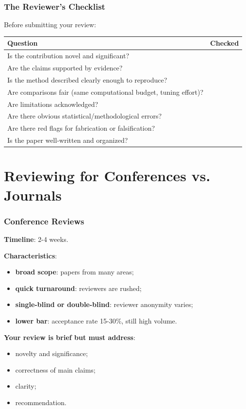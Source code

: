 \documentclass[]{beamer}
\begin{document}
\begin{frame}[fragile]
\frametitle{The Reviewer's Checklist}
Before submitting your review:

{\footnotesize
\begin{tabular}{p{6.5cm}p{3.5cm}}
\toprule
\textbf{Question} & \textbf{Checked} \\
\midrule
Is the contribution novel and significant? & \\
Are the claims supported by evidence? & \\
Is the method described clearly enough to reproduce? & \\
Are comparisons fair (same computational budget, tuning effort)? & \\
Are limitations acknowledged? & \\
Are there obvious statistical/methodological errors? & \\
Are there red flags for fabrication or falsification? & \\
Is the paper well-written and organized? & \\
\bottomrule
\end{tabular}
}

\end{frame}

\section{Reviewing for Conferences vs. Journals}

\begin{frame}[fragile]
\frametitle{Conference Reviews}
\textbf{Timeline}: 2-4 weeks.

\textbf{Characteristics}:
\begin{itemize}
  \item \textbf{broad scope}: papers from many areas;
  \item \textbf{quick turnaround}: reviewers are rushed;
  \item \textbf{single-blind or double-blind}: reviewer anonymity varies;
  \item \textbf{lower bar}: acceptance rate 15-30\%, still high volume.
\end{itemize}

\textbf{Your review is brief but must address}:
\begin{itemize}
  \item novelty and significance;
  \item correctness of main claims;
  \item clarity;
  \item recommendation.
\end{itemize}

\end{frame}
\end{document}
